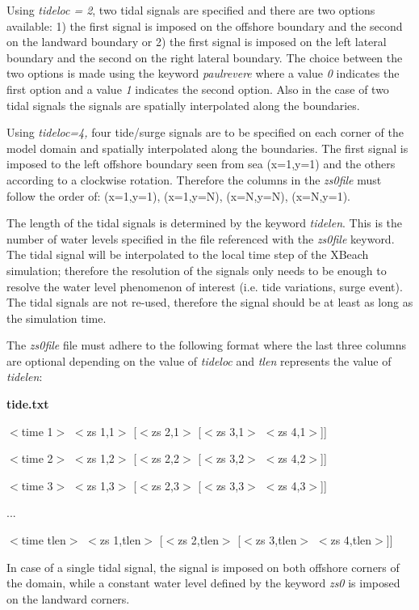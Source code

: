 \documentclass{article}
\begin{document}
\noindent Using \textit{tideloc = 2}, two tidal signals are specified and there are two options available: 1) the first signal is imposed on the offshore boundary and the second on the landward boundary or 2) the first signal is imposed on the left lateral boundary and the second on the right lateral boundary. The choice between the two options is made using the keyword \textit{paulrevere} where a value \textit{0} indicates the first option and a value \textit{1} indicates the second option. Also in the case of two tidal signals the signals are spatially interpolated along the boundaries.

\noindent Using \textit{tideloc=4, }four tide/surge signals are to be specified\textit{ }on each corner of the model domain and spatially interpolated along the boundaries. The first signal is imposed to the left offshore boundary seen from sea (x=1,y=1) and the others according to a clockwise rotation. Therefore the columns in the \textit{zs0file }must follow the order of: (x=1,y=1), (x=1,y=N), (x=N,y=N), (x=N,y=1).

\noindent The length of the tidal signals is determined by the keyword \textit{tidelen}. This is the number of water levels specified in the file referenced with the \textit{zs0file} keyword. The tidal signal will be interpolated to the local time step of the XBeach simulation; therefore the resolution of the signals only needs to be enough to resolve the water level phenomenon of interest (i.e. tide variations, surge event). The tidal signals are not re-used, therefore the signal should be at least as long as the simulation time.

\noindent The \textit{zs0file} file must adhere to the following format where the last three columns are optional depending on the value of \textit{tideloc} and \textit{tlen} represents the value of \textit{tidelen}:

\noindent \textbf{tide.txt}

\noindent $<$time 1$>$ $<$zs 1,1$>$ [$<$zs 2,1$>$ [$<$zs 3,1$>$ $<$zs 4,1$>$]]

\noindent $<$time 2$>$ $<$zs 1,2$>$ [$<$zs 2,2$>$ [$<$zs 3,2$>$ $<$zs 4,2$>$]]

\noindent $<$time 3$>$ $<$zs 1,3$>$ [$<$zs 2,3$>$ [$<$zs 3,3$>$ $<$zs 4,3$>$]]

\noindent ...

\noindent $<$time tlen$>$ $<$zs 1,tlen$>$ [$<$zs 2,tlen$>$ [$<$zs 3,tlen$>$ $<$zs 4,tlen$>$]]

\noindent In case of a single tidal signal, the signal is imposed on both offshore corners of the domain, while a constant water level defined by the keyword \textit{zs0} is imposed on the landward corners. 
\end{document}
